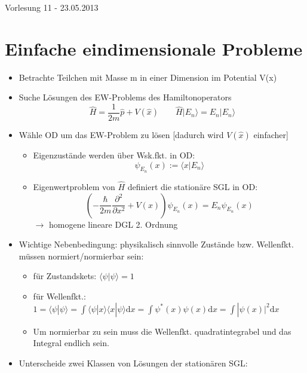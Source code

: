 \documentclass[10pt,article,colorback,accentcolor=tud9d]{scrartcl}
\begin{document}
\begin{flushright}
Vorlesung 11 - 23.05.2013
\end{flushright}
\section{Einfache eindimensionale Probleme}
\begin{itemize}
  \item Betrachte Teilchen mit Masse m in einer Dimension im Potential V(x)
  \item Suche Lösungen des EW-Problems des Hamiltonoperators
    \begin{equation}
      \hat{H}=\frac{1}{2m}\hat{p} + V(\hat{x}) \quad \quad \hat{H}|E_n\rangle = E_n|E_n\rangle
    \end{equation}
   \item Wähle OD um das EW-Problem zu lösen [dadurch wird $V(\hat{x})$ einfacher]
     \begin{itemize}
       \item Eigenzustände werden über Wsk.fkt. in OD:
          \begin{equation}
            \psi_{E_n}(x) := \langle x|E_n \rangle
          \end{equation}
       \item Eigenwertproblem von $\hat{H}$ definiert die stationäre SGL in OD:
          \begin{equation}
            \left(-\frac{\hbar}{2m} \frac{\partial^2}{\partial x^2} + V(x) \right)\psi_{E_n}(x) = E_n \psi_{E_n}(x)
          \end{equation}
          $\rightarrow$ homogene lineare DGL 2. Ordnung
     \end{itemize}
   \item Wichtige Nebenbedingung: physikalisch sinnvolle Zustände bzw. Wellenfkt. müssen normiert/normierbar sein:
      \begin{itemize}
       \item für Zustandskets: $\langle \psi | \psi \rangle = 1 $
       \item für Wellenfkt.: $ 1= \langle \psi | \psi \rangle = \int \langle \psi | x \rangle \langle x | \psi \rangle \mathrm{d}x = \int \psi^*(x)\psi(x) \mathrm{d}x = \int |\psi(x)|^2 \mathrm{d}x $
       \item Um normierbar zu sein muss die Wellenfkt. quadratintegrabel und das Integral endlich sein.
      \end{itemize}
   \item Unterscheide zwei Klassen von Lösungen der stationären SGL:

\end{itemize}
\end{document}
